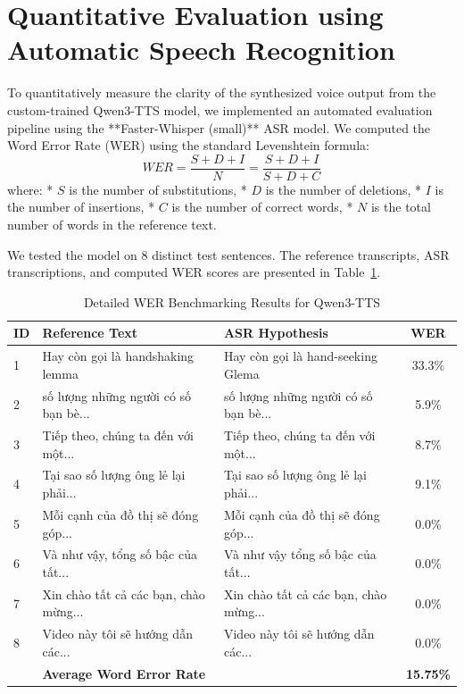 \documentclass[a4paper,12pt]{report}
\begin{document}
\section{Quantitative Evaluation using Automatic Speech Recognition}
To quantitatively measure the clarity of the synthesized voice output from the custom-trained Qwen3-TTS model, we implemented an automated evaluation pipeline using the **Faster-Whisper (small)** ASR model. We computed the Word Error Rate (WER) using the standard Levenshtein formula:
\begin{equation}
    WER = \frac{S + D + I}{N} = \frac{S + D + I}{S + D + C}
\end{equation}
where:
* $S$ is the number of substitutions,
* $D$ is the number of deletions,
* $I$ is the number of insertions,
* $C$ is the number of correct words,
* $N$ is the total number of words in the reference text.

We tested the model on 8 distinct test sentences. The reference transcripts, ASR transcriptions, and computed WER scores are presented in Table~\ref{tab:wer_results_full}.

\begin{table}[h!]
\centering
\small
\begin{tabular}{lllc}
\toprule
\textbf{ID} & \textbf{Reference Text} & \textbf{ASR Hypothesis} & \textbf{WER} \\
\midrule
1 & Hay còn gọi là handshaking lemma & Hay còn gọi là hand-seeking Glema & 33.3\% \\
2 & số lượng những người có số bạn bè... & số lượng những người có số bạn bè... & 5.9\% \\
3 & Tiếp theo, chúng ta đến với một... & Tiếp theo, chúng ta đến với một... & 8.7\% \\
4 & Tại sao số lượng ông lẻ lại phải... & Tại sao số lượng ông lẻ lại phải... & 9.1\% \\
5 & Mỗi cạnh của đồ thị sẽ đóng góp... & Mỗi cạnh của đồ thị sẽ đóng góp... & 0.0\% \\
6 & Và như vậy, tổng số bậc của tất... & Và như vậy tổng số bậc của tất... & 0.0\% \\
7 & Xin chào tất cả các bạn, chào mừng... & Xin chào tất cả các bạn, chào mừng... & 0.0\% \\
8 & Video này tôi sẽ hướng dẫn các... & Video này tôi sẽ hướng dẫn các... & 0.0\% \\
\midrule
& \textbf{Average Word Error Rate} & & \textbf{15.75\%} \\
\bottomrule
\end{tabular}
\caption{Detailed WER Benchmarking Results for Qwen3-TTS}
\label{tab:wer_results_full}
\end{table}
\end{document}
